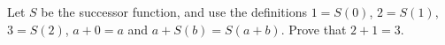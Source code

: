 Let $S$ be the successor function, and use the definitions $1=S(0)$, $2=S(1)$, $3=S(2)$, $a+0=a$ and $a+S(b)=S(a+b)$. Prove that $2+1=3$.
